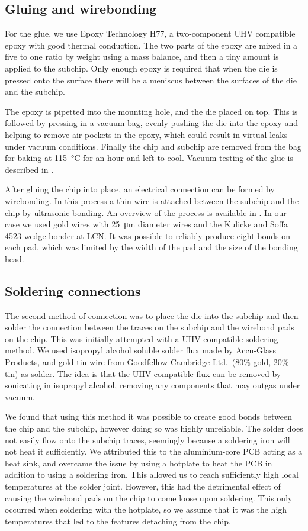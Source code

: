 \subsection{Gluing and wirebonding}

For the glue, we use Epoxy Technology H77, a two-component UHV compatible epoxy
with good thermal conduction.  The two parts of the epoxy are mixed in a five
to one ratio by weight using a mass balance, and then a tiny amount is applied
to the subchip. Only enough epoxy is required that when the die is pressed onto
the surface there will be a meniscus between the surfaces of the die and the
subchip.

The epoxy is pipetted into the mounting hole, and the die placed on top. This
is followed by pressing in a vacuum bag, evenly pushing the die into the epoxy
and helping to remove air pockets in the epoxy, which could result in
virtual leaks under vacuum conditions.
%
Finally the chip and subchip are removed from the bag for baking at
\SI{115}{\celsius} for an hour and left to cool. Vacuum testing of the glue is
described in .

After gluing the chip into place, an electrical connection can be formed by
wirebonding. In this process a thin wire is attached between the subchip and
the chip by ultrasonic bonding. An overview of the process is available in
. In our case we used gold wires with
\SI{25}{\micro\meter} diameter wires and the Kulicke and Soffa 4523 wedge
bonder at LCN. It was possible to reliably produce eight bonds on each pad,
which was limited by the width of the pad and the size of the bonding head.

\subsection{Soldering connections}
\label{fab:solder}

The second method of connection was to place the die into the subchip and then
solder the connection between the traces on the subchip and the wirebond pads
on the chip. This was initially attempted with a UHV compatible soldering
method. We used isopropyl alcohol soluble solder flux made by Accu-Glass
Products, and gold-tin wire from Goodfellow Cambridge Ltd.\ (80\% gold, 20\%
tin) as solder. The idea is that the UHV compatible flux can be removed by
sonicating in isopropyl alcohol, removing any components that may outgas under
vacuum.

We found that using this method it was possible to create good bonds between
the chip and the subchip, however doing so was highly unreliable. The solder
does not easily flow onto the subchip traces, seemingly because a soldering
iron will not heat it sufficiently. We attributed this to the aluminium-core
PCB acting as a heat sink, and overcame the issue by using a hotplate to heat
the PCB in addition to using a soldering iron. This allowed us to reach
sufficiently high  local temperatures at the solder joint.
%
However, this had the detrimental effect of causing the wirebond pads on the
chip to come loose upon soldering. This only occurred when soldering with the
hotplate, so we assume that it was the high temperatures that led to the
features detaching from the chip.

